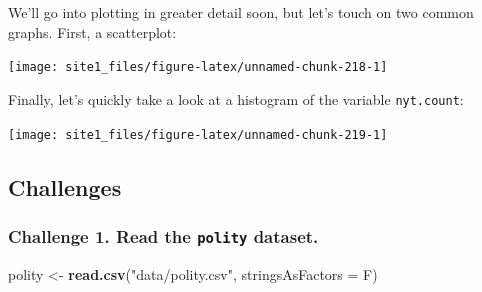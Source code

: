 \documentclass[]{book}
\newenvironment{Shaded}{\begin{snugshade}}{\end{snugshade}}
\newcommand{\KeywordTok}[1]{\textcolor[rgb]{0.13,0.29,0.53}{\textbf{#1}}}
\newcommand{\DataTypeTok}[1]{\textcolor[rgb]{0.13,0.29,0.53}{#1}}
\newcommand{\DecValTok}[1]{\textcolor[rgb]{0.00,0.00,0.81}{#1}}
\newcommand{\StringTok}[1]{\textcolor[rgb]{0.31,0.60,0.02}{#1}}
\newcommand{\OperatorTok}[1]{\textcolor[rgb]{0.81,0.36,0.00}{\textbf{#1}}}
\newcommand{\NormalTok}[1]{#1}
\begin{document}
We'll go into plotting in greater detail soon, but let's touch on two
common graphs. First, a scatterplot:

\begin{Shaded}
\end{Shaded}

\begin{center}\texttt{[image: site1\_files/figure-latex/unnamed-chunk-218-1]} \end{center}

Finally, let's quickly take a look at a histogram of the variable
\texttt{nyt.count}:

\begin{Shaded}
\end{Shaded}

\begin{center}\texttt{[image: site1\_files/figure-latex/unnamed-chunk-219-1]} \end{center}

\subsection{Challenges}\label{challenges-10}

\subsubsection*{\texorpdfstring{Challenge 1. Read the \texttt{polity}
dataset.}{Challenge 1. Read the polity dataset.}}\label{challenge-1.-read-the-polity-dataset.}

\begin{Shaded}
\begin{Highlighting}[]
\NormalTok{polity <-}\StringTok{ }\KeywordTok{read.csv}\NormalTok{(}\StringTok{"data/polity.csv"}\NormalTok{, }\DataTypeTok{stringsAsFactors =}\NormalTok{ F)}
\end{Highlighting}
\end{Shaded}
\end{document}
